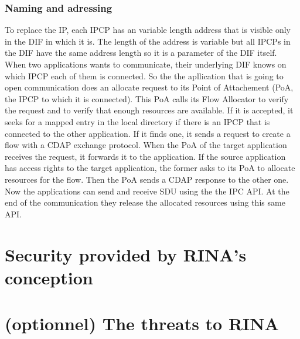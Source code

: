 \documentclass[a4paper]{proc}
\begin{document}
\section{Naming and adressing}
To replace the IP, each IPCP has an variable length address that is visible only in the DIF in which it is.
The length of the address is variable but all IPCPs in the DIF have the same address length so it is a parameter of the DIF itself.
When two applications wants to communicate, their underlying DIF knows on which IPCP each of them is connected.
So the the apllication that is going to open communication does an allocate request to its Point of Attachement (PoA, the IPCP to which it is connected).
This PoA calls its Flow Allocator to verify the request and to verify that enough resources are available.
If it is accepted, it seeks for a mapped entry in the local directory if there is an IPCP that is connected to the other application.
If it finds one, it sends a request to create a flow with a CDAP exchange protocol.
When the PoA of the target application receives the request, it forwards it to the application.
If the source application has access rights to the target application, the former asks to its PoA to allocate resources for the flow.
Then the PoA sends a CDAP response to the other one.
Now the applications can send and receive SDU using the the IPC API\@.
At the end of the communication they release the allocated resources using this same API\@.\cite{Trouva2011ISTI}

\part{Security provided by RINA's conception}

\part{(optionnel) The threats to RINA}

\nocite{*}
\newpage


\end{document}
